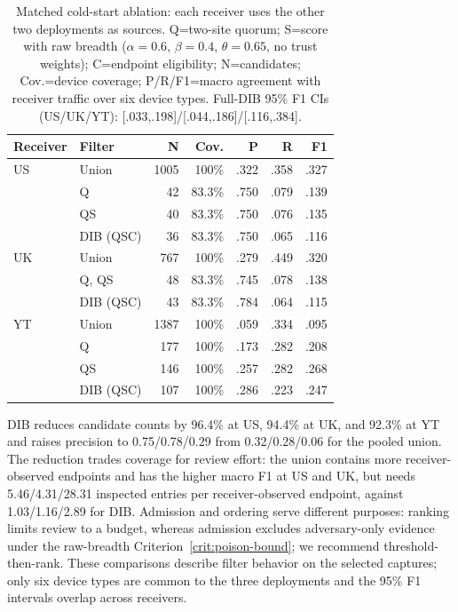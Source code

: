 \documentclass[journal]{IEEEtran}
\theoremstyle{definition}
\begin{document}
\begin{table}[t]
\centering
\caption{Matched cold-start ablation: each receiver uses the other two deployments as sources. Q=two-site quorum; S=score with raw breadth ($\alpha=0.6$, $\beta=0.4$, $\theta=0.65$, no trust weights); C=endpoint eligibility; N=candidates; Cov.=device coverage; P/R/F1=macro agreement with receiver traffic over six device types. Full-DIB 95\% F1 CIs (US/UK/YT): [.033,.198]/[.044,.186]/[.116,.384].}
\label{tab:threelab}
\scriptsize
\begin{tabular}{@{}llrrrrr@{}}
\toprule
Receiver & Filter & N & Cov. & P & R & F1 \\
\midrule
US & Union & 1005 & 100\% & .322 & .358 & .327 \\
 & Q & 42 & 83.3\% & .750 & .079 & .139 \\
 & QS & 40 & 83.3\% & .750 & .076 & .135 \\
 & DIB (QSC) & 36 & 83.3\% & .750 & .065 & .116 \\
\midrule
UK & Union & 767 & 100\% & .279 & .449 & .320 \\
 & Q, QS & 48 & 83.3\% & .745 & .078 & .138 \\
 & DIB (QSC) & 43 & 83.3\% & .784 & .064 & .115 \\
\midrule
YT & Union & 1387 & 100\% & .059 & .334 & .095 \\
 & Q & 177 & 100\% & .173 & .282 & .208 \\
 & QS & 146 & 100\% & .257 & .282 & .268 \\
 & DIB (QSC) & 107 & 100\% & .286 & .223 & .247 \\
\bottomrule
\end{tabular}
\end{table}

DIB reduces candidate counts by 96.4\% at US, 94.4\% at UK, and 92.3\% at YT and raises precision to 0.75/0.78/0.29 from 0.32/0.28/0.06 for the pooled union. The reduction trades coverage for review effort: the union contains more receiver-observed endpoints and has the higher macro F1 at US and UK, but needs 5.46/4.31/28.31 inspected entries per receiver-observed endpoint, against 1.03/1.16/2.89 for DIB. Admission and ordering serve different purposes: ranking limits review to a budget, whereas admission excludes adversary-only evidence under the raw-breadth Criterion~\ref{crit:poison-bound}; we recommend threshold-then-rank. These comparisons describe filter behavior on the selected captures; only six device types are common to the three deployments and the 95\% F1 intervals overlap across receivers.
\end{document}
